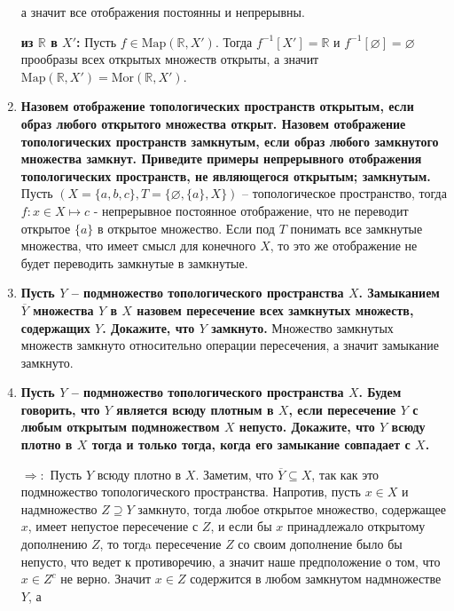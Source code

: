\documentclass{article}
\begin{document}
\begin{enumerate}
        а значит все отображения постоянны и непрерывны.\par
        \textbf{из $\mathbb{R}$ в $X'$:} Пусть $f\in\text{Map}(\mathbb{R}, X')$.
        Тогда $f^{-1}[X'] = \mathbb{R}$ и $f^{-1}[\varnothing]=\varnothing$
        прообразы всех открытых множеств открыты, а значит $\text{Map}(
        \mathbb{R}, X')=\text{Mor}(\mathbb{R}, X')$.
    \item \textbf{Назовем отображение топологических пространств открытым,
        если образ любого открытого множества открыт. Назовем отображение
        топологических пространств замкнутым, если образ любого
        замкнутого множества замкнут. Приведите примеры непрерывного
        отображения топологических пространств, не являющегося открытым;
        замкнутым.} Пусть $(X = \{a,b,c\}, T = \{\varnothing, \{a\}, X\})$ –
        топологическое пространство, тогда $f:x\in X\mapsto c$ - непрерывное 
        постоянное отображение, что не переводит открытое $\{a\}$ в открытое
        множество. Если под $T$ понимать все замкнутые множества, что имеет
        смысл для конечного $X$, то это же отображение не будет переводить
        замкнутые в замкнутые.
    \item \textbf{Пусть $Y$ – подмножество топологического пространства $X$.
        Замыканием $\overline{Y}$ множества $Y$ в $X$ назовем пересечение всех
        замкнутых множеств, содержащих $Y$. Докажите, что $Y$ замкнуто.}
        Множество замкнутых множеств замкнуто относительно операции
        пересечения, а значит замыкание замкнуто.
    \item \textbf{Пусть $Y$ – подмножество топологического пространства $X$.
        Будем говорить, что $Y$ является всюду плотным в $X$, если
        пересечение $Y$ с любым открытым подмножеством $X$ непусто. Докажите,
        что $Y$ всюду плотно в $X$ тогда и только тогда, когда его замыкание
        совпадает с $X$.}\par
        $\Rightarrow:$ Пусть $Y$ всюду плотно в $X$. Заметим, что $\overline{Y}
        \subseteq X$, так как это подмножество топологического пространства.
        Напротив, пусть $x\in X$ и надмножество $Z\supseteq Y$ замкнуто, тогда
        любое открытое множество, содержащее $x$, имеет непустое пересечение с
        $Z$, и если бы $x$ принадлежало открытому дополнению $Z$, то тогдa
        пересечение $Z$ со своим дополнение было бы непусто, что ведет к
        противоречию, а значит наше предположение о том, что $x\in Z^c$ не
        верно. Значит $x\in Z$ содержится в любом замкнутом надмножестве $Y$, а

\end{enumerate}
\end{document}
